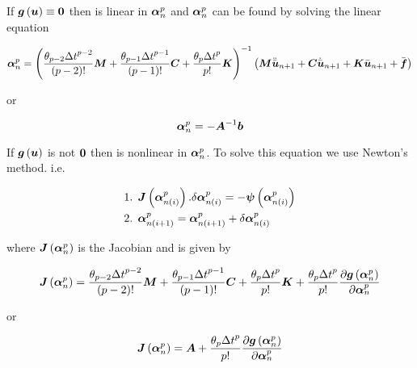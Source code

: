 If $\fnof{\vect{g}}{\vect{u}}\equiv\vect{0}$ then  is linear in
$\vect{\alpha}^{p}_{n}$ and $\vect{\alpha}^{p}_{n}$ can be found by solving
the linear equation

\begin{equation}
  \vect{\alpha}^{p}_{n} =\inverse{\pbrac{\dfrac{\theta_{p-2}{\Delta t}^{p-2}}{\factorial{p-2}}\matr{M}+
      \dfrac{\theta_{p-1}{\Delta t}^{p-1}}{\factorial{p-1}}\matr{C}+
      \dfrac{\theta_{p}{\Delta
          t}^{p}}{p!}\matr{K}}}\pbrac{\matr{M}\ddot{\bar{\vect{u}}}_{n+1}+
    \matr{C}\dot{\bar{\vect{u}}}_{n+1}+\matr{K}\bar{\vect{u}}_{n+1}+\bar{\vect{f}}}
\end{equation}

or 

\begin{equation}
  \vect{\alpha}^{p}_{n} =-\inverse{\matr{A}}\vect{b}
\end{equation}

If $\fnof{\vect{g}}{\vect{u}}$ is not $\vect{0}$ then  is nonlinear in $\vect{\alpha}^{p}_{n}$. To solve this
equation we use Newton's method. i.e.

\begin{equation}
  \begin{split}
    \text{1.  } & \fnof{\matr{J}}{\vect{\alpha}^{p}_{n(i)}}.\delta
    \vect{\alpha}^{p}_{n(i)} = 
    -\fnof{\vect{\psi}}{\vect{\alpha}^{p}_{n(i)}} \\
    \text{2.  } & \vect{\alpha}^{p}_{n(i+1)}=\vect{\alpha}^{p}_{n(i+1)}+\delta
    \vect{\alpha}^{p}_{n(i)}
  \end{split}
\end{equation}

where $\fnof{\matr{J}}{\vect{\alpha}^{p}_{n}}$ is the Jacobian and is given by

\begin{equation}
  \fnof{\matr{J}}{\vect{\alpha}^{p}_{n}}=\dfrac{\theta_{p-2}{\Delta t}^{p-2}}{\factorial{p-2}}\matr{M}+\dfrac{\theta_{p-1}{\Delta
      t}^{p-1}}{\factorial{p-1}}\matr{C}+\dfrac{\theta_{p}{\Delta
      t}^{p}}{p!}\matr{K}+\dfrac{\theta_{p}{\Delta t}^{p}}{p!}
  \delby{\fnof{\vect{g}}{\vect{\alpha}^{p}_{n}}}{\vect{\alpha}^{p}_{n}}
\end{equation}

or

\begin{equation}
  \fnof{\matr{J}}{\vect{\alpha}^{p}_{n}}=\matr{A}+\dfrac{\theta_{p}{\Delta t}^{p}}{p!}\delby{\fnof{\vect{g}}{\vect{\alpha}^{p}_{n}}}{\vect{\alpha}^{p}_{n}}
\end{equation}

